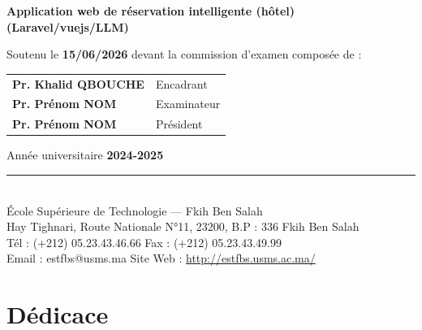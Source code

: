 \documentclass[12pt, a4paper]{report}
\begin{document}
\begin{titlepage}
  \vspace{0.5cm}

  \begin{tcolorbox}[
    colback=white, colframe=black,
    boxrule=1.5pt, arc=6pt,
    width=0.85\linewidth
  ]
    \centering\Large\bfseries
    Application web de réservation intelligente (hôtel) (Laravel/vuejs/LLM)
  \end{tcolorbox}

  \vspace{0.5cm}

  {\large Soutenu le \textbf{15/06/2026} devant la commission d'examen composée de :}\\[0.3cm]
  \begin{tabular}{ll}
    \textbf{Pr. Khalid QBOUCHE} & Encadrant \\
    \textbf{Pr. Prénom NOM} & Examinateur \\
    \textbf{Pr. Prénom NOM} & Président \\
  \end{tabular}

  \vspace{0.4cm}
  {\large Année universitaire \textbf{2024-2025}}

  \vspace{0.3cm}
  \rule{\linewidth}{0.4pt}\\
  {\footnotesize École Supérieure de Technologie — Fkih Ben Salah\\
  Hay Tighnari, Route Nationale N°11, 23200, B.P : 336 Fkih Ben Salah\\
  Tél : (+212) 05.23.43.46.66 \quad Fax : (+212) 05.23.43.49.99\\
  Email : estfbs@usms.ma \quad Site Web : \url{http://estfbs.usms.ac.ma/}}
\end{titlepage}

\setcounter{page}{1}

\chapter*{Dédicace}
\thispagestyle{plain}
\end{document}
